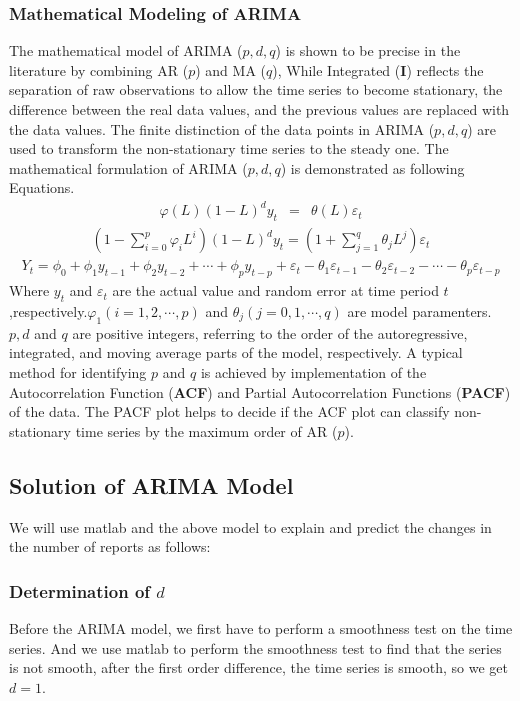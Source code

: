 \documentclass[12pt]{article}  %
\begin{document}
\subsubsection{Mathematical Modeling of ARIMA}
The mathematical model of ARIMA ($p, d, q$) is shown to be precise in the literature by combining AR ($p$)
and MA ($q$), While Integrated (\textbf{I}) reflects the separation of raw observations to allow the time series to become
stationary, the difference between the real data values, and the previous values are replaced with the data values.
The finite distinction of the data points in ARIMA ($p, d, q$) are used to transform the non-stationary time series to
the steady one. The mathematical formulation of ARIMA ($p, d, q$) is demonstrated as following Equations.
\begin{eqnarray}
	\varphi (L)(1-L)^dy_t & = & \theta (L)\varepsilon _t
\end{eqnarray}
\begin{eqnarray}
	(1-\sum_{i=0}^{p}\varphi _iL^i)(1-L)^dy_t=(1+\sum_{j=1}^q\theta_jL^j)\varepsilon_t
\end{eqnarray}
\begin{eqnarray}
	Y_t=\phi _0+\phi_1y_{t-1}+\phi_2y_{t-2}+\cdots +\phi_py_{t-p}+\varepsilon _t-\theta_1\varepsilon_{t-1}-\theta_2\varepsilon_{t-2}-\cdots-\theta_p\varepsilon_{t-p}
\end{eqnarray}
Where $y_t$ and $\varepsilon_t$ are the actual value and random error at time period $t$,respectively.$\varphi_1(i=1,2,\cdots ,p)$ and $\theta_j(j=0,1,\cdots ,q)$ are model paramenters. $p,d$ and $q$ are positive integers, referring to the order of the autoregressive, integrated, and moving average parts of the model, respectively. A typical method for identifying $p$ and $q$ is achieved by implementation of the Autocorrelation Function (\textbf{ACF}) and Partial Autocorrelation Functions (\textbf{PACF}) of the data.
The PACF plot helps to decide if the ACF plot can classify non-stationary time series by the maximum order of
AR ($p$).
\subsection{Solution of ARIMA Model}
We will use matlab and the above model to explain and predict the changes in the number of reports as follows:
\subsubsection{Determination of $d$}
Before the ARIMA model, we first have to perform a smoothness test on the time series. And we use matlab to perform the smoothness test to find that the series is not smooth, after the first order difference, the time series is smooth, so we get $d=1$.
\end{document}
